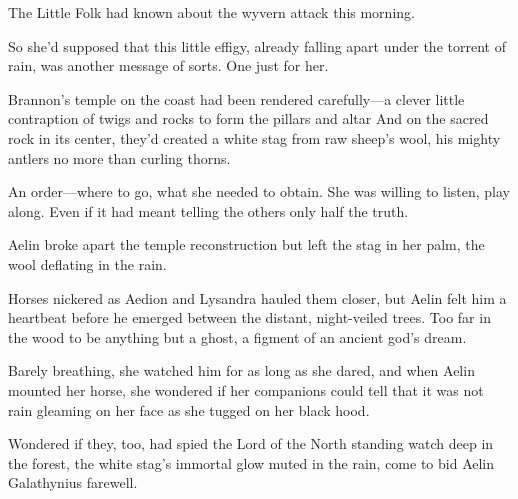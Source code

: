 The Little Folk had known about the wyvern attack this morning.

So she'd supposed that this little effigy, already falling apart under the torrent of rain, was another message of sorts. One just for her.

Brannon's temple on the coast had been rendered carefully---a clever little contraption of twigs and rocks to form the pillars and altar
 And on the sacred rock in its center, they'd created a white stag from raw sheep's wool, his mighty antlers no more than curling thorns.

An order---where to go, what she needed to obtain. She was willing to listen, play along. Even if it had meant telling the others only half the truth.

Aelin broke apart the temple reconstruction but left the stag in her palm, the wool deflating in the rain.

Horses nickered as Aedion and Lysandra hauled them closer, but Aelin felt him a heartbeat before he emerged between the distant, night-veiled trees. Too far in the wood to be anything but a ghost, a figment of an ancient god's dream.

Barely breathing, she watched him for as long as she dared, and when Aelin mounted her horse, she wondered if her companions could tell that it was not rain gleaming on her face as she tugged on her black hood.

Wondered if they, too, had spied the Lord of the North standing watch deep in the forest, the white stag's immortal glow muted in the rain, come to bid Aelin Galathynius farewell.
